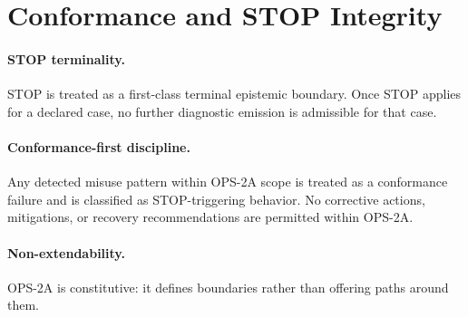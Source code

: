 ﻿%

\section{Conformance and STOP Integrity}

\paragraph{STOP terminality.}
STOP is treated as a first-class terminal epistemic boundary. Once STOP applies for
a declared case, no further diagnostic emission is admissible for that case.

\paragraph{Conformance-first discipline.}
Any detected misuse pattern within OPS-2A scope is treated as a conformance failure
and is classified as STOP-triggering behavior. No corrective actions, mitigations,
or recovery recommendations are permitted within OPS-2A.

\paragraph{Non-extendability.}
OPS-2A is constitutive: it defines boundaries rather than offering paths around them.

